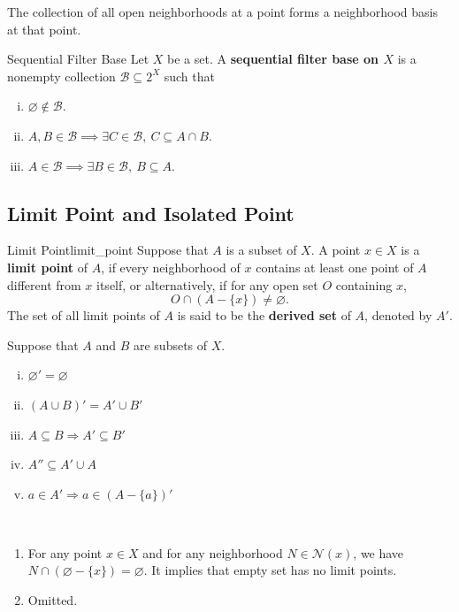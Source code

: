 \documentclass{report}
\begin{document}
\begin{proposition}{}{}
	The collection of all open neighborhoods at a point forms a neighborhood basis at that point.
\end{proposition}

\begin{definition}{Sequential Filter Base}{}
	Let $X$ be a set. A \textbf{sequential filter base on $X$} is a nonempty collection $\mathcal{B}\subseteq 2^X$ such that
	\begin{enumerate}[(i)]
		\item $\varnothing\notin\mathcal{B}$.
		\item $A,B\in\mathcal{B}\implies \exists C\in\mathcal{B},\ C\subseteq A\cap B$.
		\item $A\in\mathcal{B}\implies \exists B\in\mathcal{B},\ B\subseteq A$.
	\end{enumerate}
\end{definition}

\subsection{Limit Point and Isolated Point}
\begin{definition}{Limit Point}{limit_point}
	Suppose that $A$ is a subset of $X$. A point $x\in X$ is a \textbf{limit point} of $A$, if every neighborhood of $x$ contains at least one point of $A$ different from $x$ itself,
	or alternatively, if for any open set $O$ containing $x$,
	\[
		O\cap(A-\{x\})\ne\varnothing.
	\]
	The set of all limit points of $A$ is said to be the \textbf{derived set} of $A$, denoted by $A'$.
\end{definition}




\begin{proposition}{}{}
	Suppose that $A$ and $B$ are subsets of $X$.
	\begin{enumerate}[(i)]
		\item $\varnothing'=\varnothing$
		\item $(A \cup B)'=A'\cup B' $
		\item $A \subseteq B \Longrightarrow A' \subseteq B'$
		\item $A'' \subseteq A' \cup A $
		\item $a \in A' \Longrightarrow a \in(A-\{a\})' $
	\end{enumerate}
\end{proposition}

\begin{prf}~\\ \vspace{-1em}
	\begin{enumerate}
		\item For any point $x\in X$ and for any neighborhood $N\in\mathcal{N}(x)$, we have $N\cap(\varnothing-\{x\})=\varnothing$. It implies that empty set has no limit points.
		\item Omitted.
	\end{enumerate}
\end{prf}
\end{document}
